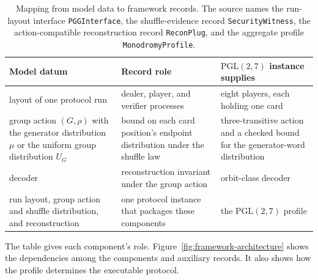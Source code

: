 \documentclass[runningheads]{llncs}
\newcommand{\coqin}[1]{\texttt{#1}}
\newcommand{\PG}{\mathrm{PGL}(2,7)}
\begin{document}
\begin{table}[H]
  \centering
  \small
  \begin{tabular}{@{}L{.26\linewidth}L{.36\linewidth}L{.30\linewidth}@{}}
    \toprule
    Model datum & Record role & $\PG$ instance supplies \\
    \midrule
    layout of one protocol run & dealer, player, and verifier processes & eight players, each holding one card \\
    group action $(G,\rho)$ with the generator distribution $\mu$ or the uniform
group distribution $U_G$ & bound on each card position's endpoint distribution under the shuffle law & three-transitive action and a checked bound for the generator-word
distribution \\
    decoder & reconstruction invariant under the group action & orbit-class decoder \\
    run layout, group action and shuffle distribution, and reconstruction & one protocol instance that packages these components & the $\PG$ profile \\
    \bottomrule
  \end{tabular}
  \caption{Mapping from model data to framework records. The source names the run-layout
interface \coqin{PGGInterface}, the shuffle-evidence record
\coqin{SecurityWitness}, the action-compatible reconstruction record
\coqin{ReconPlug}, and the aggregate profile \coqin{MonodromyProfile}.}
  \label{tab:bridge}
\end{table}

The table gives each component's role. Figure~\ref{fig:framework-architecture}
shows the dependencies among the components and auxiliary records. It also
shows how the profile determines the executable protocol.
\end{document}
